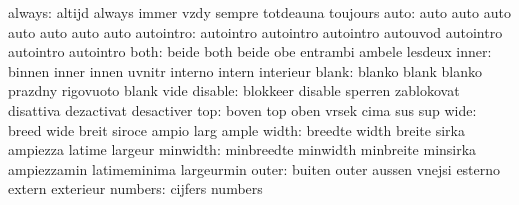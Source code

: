                   always: altijd                    always
                           immer                     vzdy
                           sempre                    totdeauna
                           toujours
                     auto: auto                      auto
                           auto                      auto
                           auto                      auto
                           auto
                autointro: autointro                 autointro
                           autointro                 autouvod
                           autointro                 autointro
                           autointro
                     both: beide                     both
                           beide                     obe
                           entrambi                  ambele
                           lesdeux
                    inner: binnen                    inner
                           innen                     uvnitr
                           interno                   intern
                           interieur
                    blank: blanko                    blank
                           blanko                    prazdny
                           rigovuoto                 blank
                           vide
                  disable: blokkeer                  disable
                           sperren                   zablokovat
                           disattiva                 dezactivat
                           desactiver
                      top: boven                     top
                           oben                      vrsek
                           cima                      sus
                           sup
                     wide: breed                     wide
                           breit                     siroce
                           ampio                     larg
                           ample
                    width: breedte                   width
                           breite                    sirka
                           ampiezza                  latime
                           largeur
                 minwidth: minbreedte                minwidth
                           minbreite                 minsirka
                           ampiezzamin               latimeminima
                           largeurmin
                    outer: buiten                    outer
                           aussen                    vnejsi
                           esterno                   extern
                           exterieur
                  numbers: cijfers                   numbers
